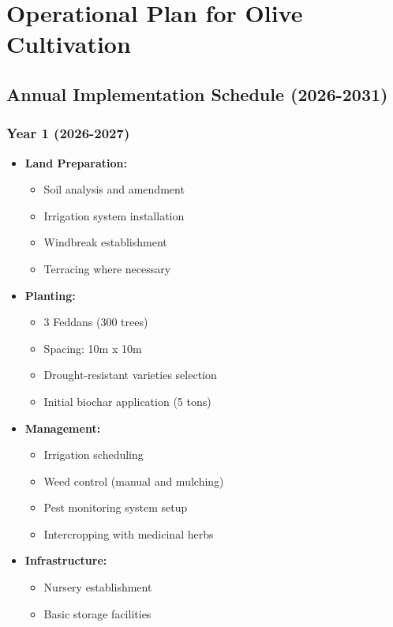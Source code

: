 \section{Operational Plan for Olive Cultivation}

\subsection{Annual Implementation Schedule (2026-2031)}

\subsubsection{Year 1 (2026-2027)}
\begin{itemize}
    \item \textbf{Land Preparation:}
    \begin{itemize}
        \item Soil analysis and amendment
        \item Irrigation system installation
        \item Windbreak establishment
        \item Terracing where necessary
    \end{itemize}
    \item \textbf{Planting:}
    \begin{itemize}
        \item 3 Feddans (300 trees)
        \item Spacing: 10m x 10m
        \item Drought-resistant varieties selection
        \item Initial biochar application (5 tons)
    \end{itemize}
    \item \textbf{Management:}
    \begin{itemize}
        \item Irrigation scheduling
        \item Weed control (manual and mulching)
        \item Pest monitoring system setup
        \item Intercropping with medicinal herbs
    \end{itemize}
    \item \textbf{Infrastructure:}
    \begin{itemize}
        \item Nursery establishment
        \item Basic storage facilities

\end{itemize}
\end{itemize}
